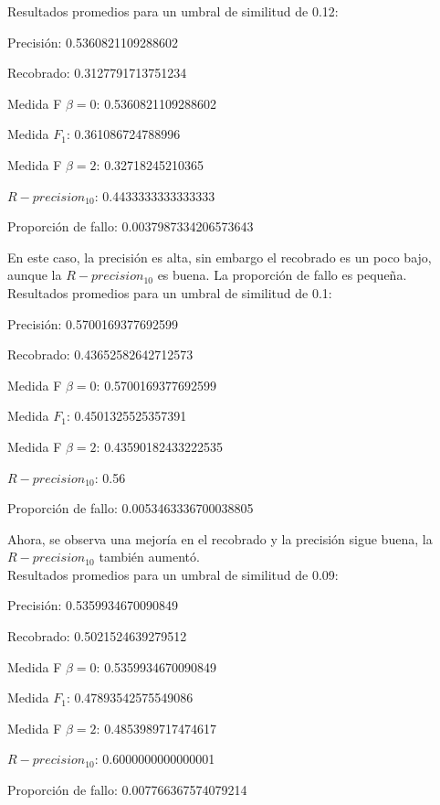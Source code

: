 \documentclass{llncs}
\begin{document}
Resultados promedios para un umbral de similitud de 0.12:\\
\begin{list}{-}{•}
\item Precisi\'on: 0.5360821109288602
\item Recobrado: 0.3127791713751234
\item Medida F $\beta = 0$: 0.5360821109288602
\item Medida $F_1$: 0.361086724788996
\item Medida F $\beta = 2$: 0.32718245210365
\item $R-precision_10$: 0.4433333333333333
\item Proporci\'on de fallo: 0.0037987334206573643
\end{list}

En este caso, la precisi\'on es alta, sin embargo el recobrado es un poco bajo, aunque la $R-precision_10$ es buena. La proporci\'on de fallo es peque\~na.\\

Resultados promedios para un umbral de similitud de 0.1:\\
\begin{list}{-}{•}
\item Precisi\'on: 0.5700169377692599
\item Recobrado: 0.43652582642712573
\item Medida F $\beta = 0$: 0.5700169377692599
\item Medida $F_1$: 0.4501325525357391
\item Medida F $\beta = 2$: 0.43590182433222535
\item $R-precision_10$: 0.56
\item Proporci\'on de fallo: 0.0053463336700038805
\end{list}

Ahora, se observa una mejor\'ia en el recobrado y la precisi\'on sigue buena, la $R-precision_10$ tambi\'en aument\'o.\\

Resultados promedios para un umbral de similitud de 0.09:\\
\begin{list}{-}{•}
\item Precisi\'on: 0.5359934670090849
\item Recobrado: 0.5021524639279512
\item Medida F $\beta = 0$: 0.5359934670090849
\item Medida $F_1$: 0.47893542575549086
\item Medida F $\beta = 2$: 0.4853989717474617
\item $R-precision_10$: 0.6000000000000001
\item Proporci\'on de fallo: 0.007766367574079214
\end{list}
\end{document}
